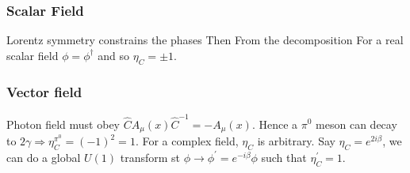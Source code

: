 \documentclass{article}
\begin{document}
\subsubsection*{Scalar Field}
Lorentz symmetry constrains the phases 
Then 
From the decomposition 
For a real scalar field $\phi=\phi^\dagger$ and so $\eta_C = \pm1$. 

\subsubsection*{Vector field}
Photon field must obey $\hat{C} A_\mu(x) \hat{C}^{-1} = -A_\mu (x)$. Hence a $\pi^0$ meson can decay to $2\gamma \Rightarrow \eta_C^{\pi^0} = (-1)^2 = 1$.
For a complex field, $\eta_C$ is arbitrary. Say $\eta_C= e^{2i\beta}$, we can do a global $U(1)$ transform st $\phi \to \phi^\prime = e^{-i\beta}\phi$ such that $\eta_C^\prime = 1$.
\end{document}
